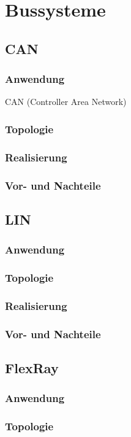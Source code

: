 \graphicspath{{./Images/Kapitel4/}}
\section{Bussysteme}
\subsection{CAN}
\subsubsection{Anwendung}
CAN (Controller Area Network) 
\subsubsection{Topologie}
\subsubsection{Realisierung}
\subsubsection{Vor- und Nachteile}

\subsection{LIN}
\subsubsection{Anwendung}
\subsubsection{Topologie}
\subsubsection{Realisierung}
\subsubsection{Vor- und Nachteile}

\subsection{FlexRay}
\subsubsection{Anwendung}
\subsubsection{Topologie}
